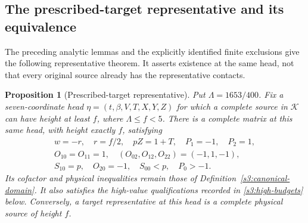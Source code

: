\documentclass[11pt,reqno]{amsart}
\newtheorem{proposition}[theorem]{Proposition}
\theoremstyle{definition}
\theoremstyle{remark}
\begin{document}
\subsection{The prescribed-target representative and its equivalence}
\label{s3:target-theorem-section}

The preceding analytic lemmas and the explicitly identified finite
exclusions give the following representative theorem. It asserts
existence at the same head, not that every original source already
has the representative contacts.

\begin{proposition}[Prescribed-target representative]
\label{s3:target-reduction}
Put \(\Lambda=1653/400\). Fix a seven-coordinate head
\(\eta=(t,\beta,V,T,X,Y,Z)\) for which a complete source in
\(\mathcal K\) can have height at least \(f\), where
\(\Lambda\le f<5\). There is a complete matrix at this same head,
with height exactly \(f\), satisfying
\begin{equation}\label{s3:target-contacts}
\begin{gathered}
 w=-r,\quad r=f/2,\quad pZ=1+T,\quad
 P_1=-1,\quad P_2=1,\\
 O_{10}=O_{11}=1,\quad
 (O_{02},O_{12},O_{22})=(-1,1,-1),\\
 S_{10}=p,\quad O_{20}=-1,\quad S_{00}<p,\quad P_0>-1.
\end{gathered}
\end{equation}
Its cofactor and physical inequalities remain those of
Definition~\ref{s3:canonical-domain}. It also satisfies the
high-value qualifications recorded in \eqref{s3:high-budgets} below.
Conversely, a target representative at this head is a complete
physical source of height \(f\).
\end{proposition}
\end{document}
